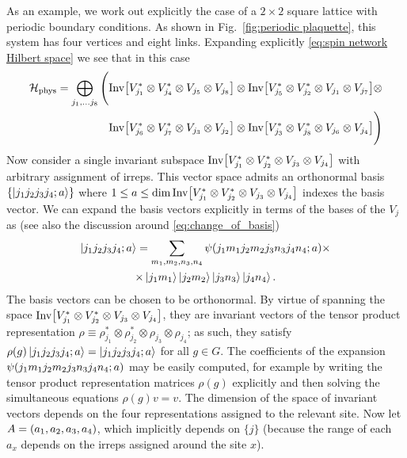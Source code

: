 As an example, we work out explicitly the case of a $2\times 2$ square lattice with periodic boundary conditions.
As shown in Fig.~\ref{fig:periodic plaquette}, this system has four vertices and eight links.
Expanding explicitly \eqref{eq:spin network Hilbert space} we see that in this case
\begin{equation}
    \begin{split}
        \HilbertPhys = \bigoplus_{j_1, \ldots j_8} \Bigg(
            & \InvSpace{1}{4}{5}{8} \otimes
              \InvSpace{5}{2}{1}{7} \otimes \\
            & \InvSpace{6}{7}{3}{2} \otimes
              \InvSpace{3}{8}{6}{4}
         \Bigg)
    \end{split}
\end{equation}
Now consider a single invariant subspace $\mathrm{Inv}\bqty{V_{j_1}^* \otimes V_{j_2}^* \otimes V_{j_3} \otimes V_{j_4}}$ with arbitrary assignment of irreps.
This vector space admits an orthonormal basis $\{\ket{j_1 j_2 j_3 j_4 ; a}\}$ where $1 \leq a \leq \dim\mathrm{Inv}\bqty{V_{j_1}^* \otimes V_{j_2}^* \otimes V_{j_3} \otimes V_{j_4}}$ indexes the basis vector.
We can expand the basis vectors explicitly in terms of the bases of the $V_j$ as (see also the discussion around \eqref{eq:change_of_basis})
\begin{multline}
    \label{eq:invariant states at a site}
    \ket{j_1 j_2 j_3 j_4 ; a} = \sum_{m_1, m_2, n_3, n_4} \psi\pqty{j_1 m_1 j_2 m_2 j_3 n_3 j_4 n_4 ; a} \times \\
        \times \jm{1} \jm{2} \jn{3} \jn{4}.
\end{multline}
The basis vectors can be chosen to be orthonormal.
By virtue of spanning the space $\mathrm{Inv}\bqty{V_{j_1}^* \otimes V_{j_2}^* \otimes V_{j_3} \otimes V_{j_4}}$, they are invariant vectors of the tensor product representation $\rho \equiv \rho_{j_1}^* \otimes \rho_{j_2}^* \otimes \rho_{j_3} \otimes \rho_{j_4}$; as such, they satisfy $\rho(g) \ket{j_1 j_2 j_3 j_4 ; a} = \ket{j_1 j_2 j_3 j_4 ; a}$ for all $g \in G$.
The coefficients of the expansion $\psi\pqty{j_1 m_1 j_2 m_2 j_3 n_3 j_4 n_4 ; a}$ may be easily computed, for example by writing the tensor product representation matrices $\rho(g)$ explicitly and then solving the simultaneous equations $\rho(g) v = v$.
The dimension of the space of invariant vectors depends on the four representations assigned to the relevant site.
Now let $A = \pqty{a_1, a_2, a_3, a_4}$, which implicitly depends on $\{j\}$ (because the range of each $a_x$ depends on the irreps assigned around the site $x$).
